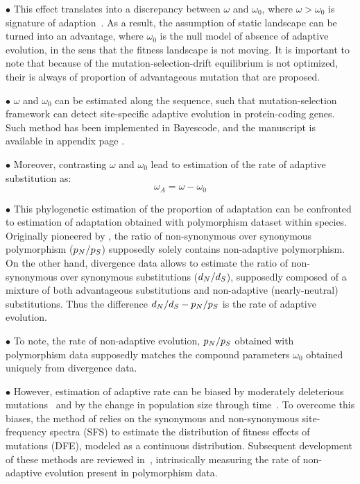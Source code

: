 $\bullet$ This effect translates into a discrepancy between $\omega$ and $\omega_0$, where $\omega > \omega_0$ is signature of adaption~\citep{Rodrigue2016}.
As a result, the assumption of static landscape can be turned into an advantage, where $\omega_0$ is the null model of absence of adaptive evolution, in the sens that the fitness landscape is not moving.
It is important to note that because of the mutation-selection-drift equilibrium is not optimized, their is always of proportion of advantageous mutation that are proposed.

$\bullet$ $\omega$ and $\omega_0$ can be estimated along the sequence, such that mutation-selection framework can detect site-specific adaptive evolution in protein-coding genes.
Such method has been implemented in Bayescode, and the manuscript is available in appendix page \pageref{sec-appendix:MutSelM3starMBE}.

$\bullet$ Moreover, contrasting $\omega$ and $\omega_0$ lead to estimation of the rate of adaptive substitution as:
\begin{equation}
    \omega_A = \omega - \omega_0
\end{equation}

$\bullet$ This phylogenetic estimation of the proportion of adaptation can be confronted to estimation of adaptation obtained with polymorphism dataset within species.
Originally pioneered by \citet{McDonald1991}, the ratio of non-synonymous over synonymous polymorphism ($p_N / p_S$) supposedly solely contains non-adaptive polymorphism.
On the other hand, divergence data allows to estimate the ratio of non-synonymous over synonymous substitutions ($d_N / d_S$), supposedly composed of a mixture of both advantageous substitutions and non-adaptive (nearly-neutral) substitutions.
Thus the difference $d_N / d_S - p_N / p_S $ is the rate of adaptive evolution.

$\bullet$ To note, the rate of non-adaptive evolution, $p_N / p_S$ obtained with polymorphism data supposedly matches the compound parameters $\omega_0$ obtained uniquely from divergence data.

$\bullet$ However, estimation of adaptive rate can be biased by moderately deleterious mutations~\citep{eyre-walker_quantifying_2002} and by the change in population size through time~\citep{eyre-walker_changing_2002}.
To overcome this biases, the method of \citet{Galtier2016} relies on the synonymous and non-synonymous site-frequency spectra (SFS) to estimate the distribution of fitness effects of mutations (DFE), modeled as a continuous distribution.
Subsequent development of these methods are reviewed in~\citep{Moutinho2019a}, intrinsically measuring the rate of non-adaptive evolution present in polymorphism data.

